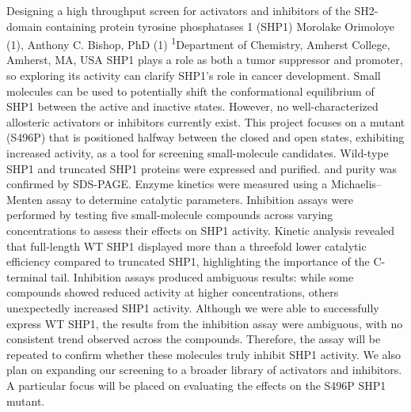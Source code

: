 \makeabstract
{
Designing a high throughput screen for activators and inhibitors of the SH2-domain containing protein tyrosine phosphatases 1 (SHP1)
}
{
Morolake Orimoloye (1), Anthony C. Bishop, PhD (1)
}
{
\textsuperscript{1}Department of Chemistry, Amherst College, Amherst, MA, USA
}
{
SHP1 plays a role as both a tumor suppressor and promoter, so exploring its activity can clarify SHP1’s role in cancer development. Small molecules can be used to potentially shift the conformational equilibrium of SHP1 between the active and inactive states. However, no well-characterized allosteric activators or inhibitors currently exist. This project focuses on a mutant (S496P) that is positioned halfway between the closed and open states, exhibiting increased activity, as a tool for screening small-molecule candidates.
}
{
Wild-type SHP1 and truncated SHP1 proteins were expressed and purified. and purity was confirmed by SDS-PAGE. Enzyme kinetics were measured using a Michaelis–Menten assay to determine catalytic parameters. Inhibition assays were performed by testing five small-molecule compounds across varying concentrations to assess their effects on SHP1 activity.
}
{
Kinetic analysis revealed that full-length WT SHP1 displayed more than a threefold lower catalytic efficiency compared to truncated SHP1, highlighting the importance of the C-terminal tail. Inhibition assays produced ambiguous results: while some compounds showed reduced activity at higher concentrations, others unexpectedly increased SHP1 activity.
}
{
Although we were able to successfully express WT SHP1, the results from the inhibition assay were ambiguous, with no consistent trend observed across the compounds. Therefore, the assay will be repeated to confirm whether these molecules truly inhibit SHP1 activity. We also plan on expanding our screening to a broader library of activators and inhibitors. A particular focus will be placed on evaluating the effects on the S496P SHP1 mutant.
}

\newpage

